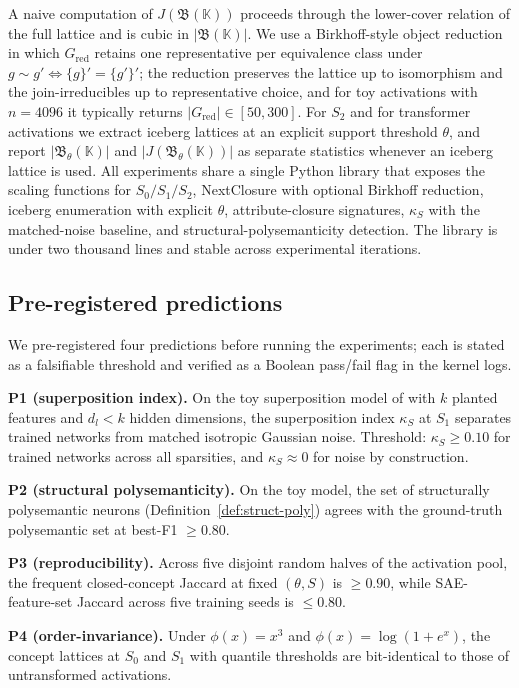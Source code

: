 \documentclass[a4paper,fleqn]{cas-dc}
\newcommand{\K}{\mathbb{K}}
\newcommand{\Lat}{\mathfrak{B}}
\newcommand{\Jirr}{J}
\newcommand{\kS}{\kappa_S}
\begin{document}
A naive computation of $\Jirr(\Lat(\K))$ proceeds through the lower-cover relation of the full lattice and is cubic in $|\Lat(\K)|$.
We use a Birkhoff-style object reduction in which $G_{\mathrm{red}}$ retains one representative per equivalence class under $g \sim g' \iff \{g\}' = \{g'\}'$; the reduction preserves the lattice up to isomorphism and the join-irreducibles up to representative choice, and for toy activations with $n = 4096$ it typically returns $|G_{\mathrm{red}}| \in [50, 300]$.
For $S_2$ and for transformer activations we extract iceberg lattices at an explicit support threshold $\theta$, and report $|\Lat_\theta(\K)|$ and $|\Jirr(\Lat_\theta(\K))|$ as separate statistics whenever an iceberg lattice is used.
All experiments share a single Python library that exposes the scaling functions for $S_0/S_1/S_2$, NextClosure with optional Birkhoff reduction, iceberg enumeration with explicit $\theta$, attribute-closure signatures, $\kS$ with the matched-noise baseline, and structural-polysemanticity detection.
The library is under two thousand lines and stable across experimental iterations.

\subsection{Pre-registered predictions}\label{ssec:predictions}

We pre-registered four predictions before running the experiments; each is stated as a falsifiable threshold and verified as a Boolean pass/fail flag in the kernel logs.

\textbf{P1 (superposition index).} On the toy superposition model of \citet{elhage2022superposition} with $k$ planted features and $d_l < k$ hidden dimensions, the superposition index $\kS$ at $S_1$ separates trained networks from matched isotropic Gaussian noise.
Threshold: $\kS \ge 0.10$ for trained networks across all sparsities, and $\kS \approx 0$ for noise by construction.

\textbf{P2 (structural polysemanticity).} On the toy model, the set of structurally polysemantic neurons (Definition~\ref{def:struct-poly}) agrees with the ground-truth polysemantic set at best-F1 $\ge 0.80$.

\textbf{P3 (reproducibility).} Across five disjoint random halves of the activation pool, the frequent closed-concept Jaccard at fixed $(\theta, S)$ is $\ge 0.90$, while SAE-feature-set Jaccard across five training seeds is $\le 0.80$.

\textbf{P4 (order-invariance).} Under $\phi(x) = x^3$ and $\phi(x) = \log(1 + e^x)$, the concept lattices at $S_0$ and $S_1$ with quantile thresholds are bit-identical to those of untransformed activations.
\end{document}
